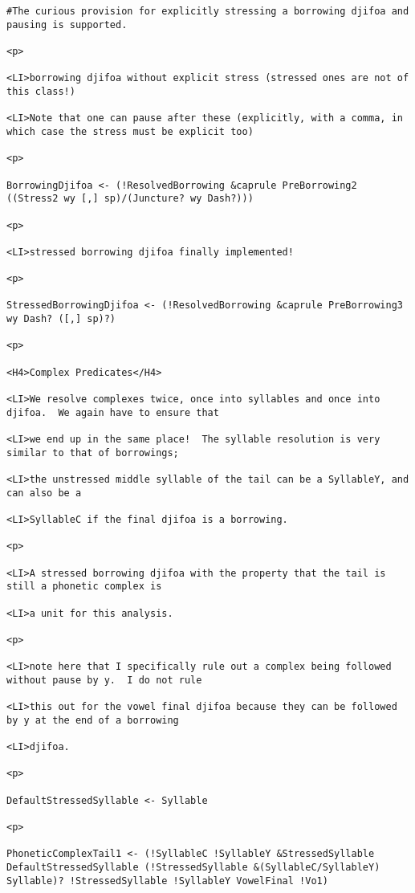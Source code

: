 \documentclass[12pt]{article}
\begin{document}
\begin{lstlisting}
#The curious provision for explicitly stressing a borrowing djifoa and pausing is supported.

<p>

<LI>borrowing djifoa without explicit stress (stressed ones are not of this class!)

<LI>Note that one can pause after these (explicitly, with a comma, in which case the stress must be explicit too)

<p>

BorrowingDjifoa <- (!ResolvedBorrowing &caprule PreBorrowing2 ((Stress2 wy [,] sp)/(Juncture? wy Dash?)))

<p>

<LI>stressed borrowing djifoa finally implemented!

<p>

StressedBorrowingDjifoa <- (!ResolvedBorrowing &caprule PreBorrowing3 wy Dash? ([,] sp)?)

<p>

<H4>Complex Predicates</H4>

<LI>We resolve complexes twice, once into syllables and once into djifoa.  We again have to ensure that

<LI>we end up in the same place!  The syllable resolution is very similar to that of borrowings;

<LI>the unstressed middle syllable of the tail can be a SyllableY, and can also be a

<LI>SyllableC if the final djifoa is a borrowing.

<p>

<LI>A stressed borrowing djifoa with the property that the tail is still a phonetic complex is

<LI>a unit for this analysis.

<p>

<LI>note here that I specifically rule out a complex being followed without pause by y.  I do not rule

<LI>this out for the vowel final djifoa because they can be followed by y at the end of a borrowing

<LI>djifoa.

<p>

DefaultStressedSyllable <- Syllable

<p>

PhoneticComplexTail1 <- (!SyllableC !SyllableY &StressedSyllable DefaultStressedSyllable (!StressedSyllable &(SyllableC/SyllableY) Syllable)? !StressedSyllable !SyllableY VowelFinal !Vo1)


\end{lstlisting}
\end{document}
